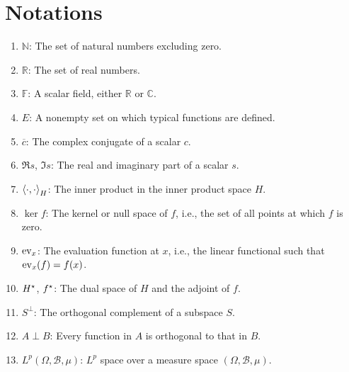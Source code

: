 \documentclass[a4paper,12pt]{article}
\begin{document}
\section*{Notations}

\begin{enumerate}
	\renewcommand{\labelenumi}{\( \diamond \)}
	\item \( \mathbb{N} \): The set of natural numbers excluding zero.
	\item \( \mathbb{R} \): The set of real numbers.
	\item \( \mathbb{F} \): A scalar field, either \( \mathbb{R} \) or \( \mathbb{C} \).
	\item \( E \): A nonempty set on which typical functions are defined.
	\item \( \overline{c} \): The complex conjugate of a scalar \( c \).
	\item \( \Re s \), \( \Im s \): The real and imaginary part of a scalar \( s \).
	\item \( \left<\cdot , \cdot  \right>_{H} \): The inner product in the inner product space \( H \).
	\item \( \ker f \): The kernel or null space of \( f \), i.e., the set of all points at which \( f \) is zero.
	\item \( \mathrm{ev}_{x} \): The evaluation function at \( x \), i.e., the linear functional such that \( \mathrm{ev}_{x}(f) = f(x) \).
	\item \( H^{\star} \), \( f^{\star} \): The dual space of \( H \) and the adjoint of \( f \).
	\item \( S^{\perp } \): The orthogonal complement of a subspace \( S \).
	\item \( A \perp B\): Every function in \( A \) is orthogonal to that in \( B \).
	\item \( L^p(\Omega, \mathscr{B}, \mu) \): \( L^{p} \) space over a measure space \( (\Omega, \mathscr{B}, \mu) \).
\end{enumerate}
\end{document}
